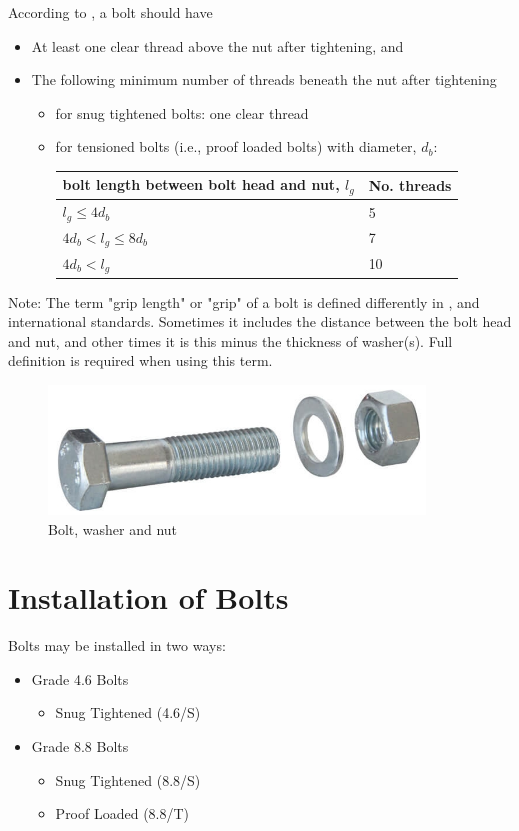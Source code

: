 According to , a bolt should have
\begin{itemize}
\item At least one clear thread above the nut after tightening, and
\item The following minimum number of threads beneath the nut after tightening
\begin{itemize}
\item for snug tightened bolts: one clear thread
\item for tensioned bolts (i.e., proof loaded bolts) with diameter, $d_b$:
\begin{center}
\begin{tabular}{ll}
    \toprule
    bolt length between bolt head and nut, $l_g$ & No. threads \\ \midrule
    $l_g\leqslant4d_b$                           & 5           \\
    $4d_b<l_g\leqslant8d_b$                      & 7           \\
    $4d_b<l_g$                                   & 10          \\ \bottomrule
\end{tabular}
\end{center}
\end{itemize}
\end{itemize}

Note: The term "grip length" or "grip" of a bolt is defined differently in ,  and international standards. Sometimes it includes the distance between the bolt head and nut, and other times it is this minus the thickness of washer(s). Full definition is required when using this term.

\begin{figure}[H]
\centering\includegraphics[width=10cm]{PIC/CH06/BOLT.WASHER}\caption{Bolt, washer and nut}
\end{figure}
\section{Installation of Bolts}
Bolts may be installed in two ways:
\begin{itemize}
\item Grade 4.6 Bolts
\begin{itemize}
\item Snug Tightened (4.6/S)
\end{itemize}
\item Grade 8.8 Bolts
\begin{itemize}
\item Snug Tightened (8.8/S)
\item Proof Loaded (8.8/T)
\end{itemize}
\end{itemize}

